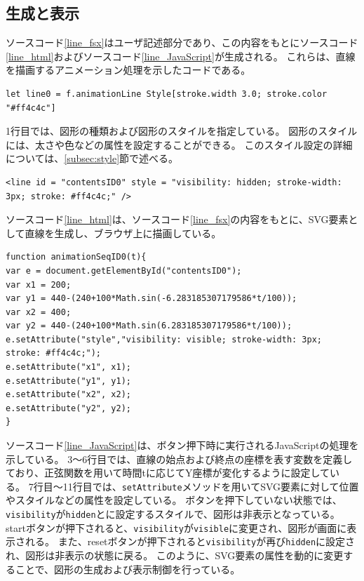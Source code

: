\subsection{生成と表示}
ソースコード\ref{line_fsx}はユーザ記述部分であり、この内容をもとにソースコード\ref{line_html}およびソースコード\ref{line_JavaScript}が生成される。
これらは、直線を描画するアニメーション処理を示したコードである。
 \begin{lstlisting}[caption={直線を描画するアニメーション（fsxファイル）},label={line_fsx},breaklines=true,breakatwhitespace=false]
let line0 = f.animationLine Style[stroke.width 3.0; stroke.color "#ff4c4c"]
\end{lstlisting}
1行目では、図形の種類および図形のスタイルを指定している。
図形のスタイルには、太さや色などの属性を設定することができる。
このスタイル設定の詳細については、\ref{subsec:style}節で述べる。
\begin{lstlisting}[caption={直線を描画するアニメーションの生成（HTMLファイル）},label={line_html},breaklines=true,breakatwhitespace=false]
<line id = "contentsID0" style = "visibility: hidden; stroke-width: 3px; stroke: #ff4c4c;" />
\end{lstlisting}
ソースコード\ref{line_html}は、ソースコード\ref{line_fsx}の内容をもとに、SVG要素として直線を生成し、ブラウザ上に描画している。
 \begin{lstlisting}[caption={直線を描画するアニメーションの表示処理（JavaScriptファイル）},label={line_JavaScript},breaklines=true,breakatwhitespace=false]
function animationSeqID0(t){
var e = document.getElementById("contentsID0");
var x1 = 200;
var y1 = 440-(240+100*Math.sin(-6.283185307179586*t/100));
var x2 = 400;
var y2 = 440-(240+100*Math.sin(6.283185307179586*t/100));
e.setAttribute("style","visibility: visible; stroke-width: 3px; stroke: #ff4c4c;");
e.setAttribute("x1", x1);
e.setAttribute("y1", y1);
e.setAttribute("x2", x2);
e.setAttribute("y2", y2);
}
\end{lstlisting}
ソースコード\ref{line_JavaScript}は、ボタン押下時に実行されるJavaScriptの処理を示している。
3～6行目では、直線の始点および終点の座標を表す変数を定義しており、正弦関数を用いて時間tに応じてY座標が変化するように設定している。
7行目～11行目では、\texttt{setAttribute}メソッドを用いてSVG要素に対して位置やスタイルなどの属性を設定している。
ボタンを押下していない状態では、\texttt{visibility}が\texttt{hidden}とに設定するスタイルで、図形は非表示となっている。
startボタンが押下されると、\texttt{visibility}が\texttt{visible}に変更され、図形が画面に表示される。
また、resetボタンが押下されると\texttt{visibility}が再び\texttt{hidden}に設定され、図形は非表示の状態に戻る。
このように、SVG要素の属性を動的に変更することで、図形の生成および表示制御を行っている。

